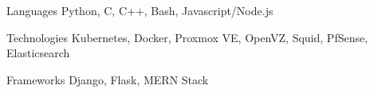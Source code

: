 
\begin{cvskills}
  \cvskill
    {Languages} %
    {Python, C, C++, Bash, Javascript/Node.js} %

  \cvskill
    {Technologies} %
    {Kubernetes, Docker, Proxmox VE, OpenVZ, Squid, PfSense, Elasticsearch} %

  \cvskill
	{Frameworks} %
	{Django, Flask, MERN Stack} %
\end{cvskills}
